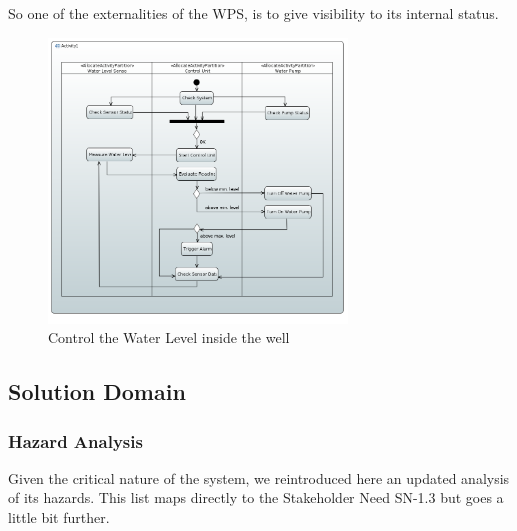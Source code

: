 \documentclass[11pt]{article}
\begin{document}
So one of the externalities of the WPS, is to give visibility to its internal status.

\begin{figure}[H]
  \centering
  \includegraphics[width=300px]{../diagrams/use-case-activity-diagram-01.png}
  \caption{Control the Water Level inside the well}
  \label{fig:Control Water Level Activity Diagram}
\end{figure}

\subsection{Solution Domain}

\subsubsection{Hazard Analysis}

Given the critical nature of the system, we reintroduced here an updated analysis of its hazards. This list maps directly to the Stakeholder Need SN-1.3 but goes a little bit further.
\end{document}
